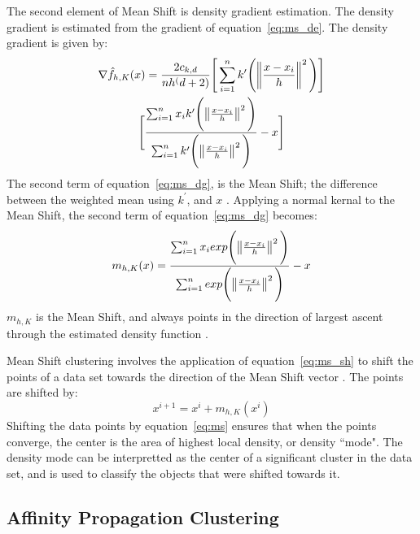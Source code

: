 The second element of Mean Shift is density gradient estimation. 
The density gradient is estimated from the gradient of equation~\ref{eq:ms_de}\citet{vatturi09}.
The density gradient is given by: 
\begin{multline}
\label{eq:ms_dg}
\nabla\hat{f}_{h,K}(x) = \frac{2c_{k,d}}{nh^(d+2)} \Bigg[ \sum_{i=1}^n k^{\prime} \Bigg( \norm{\frac{x-x_{i}}{h}}^2 \Bigg) \Bigg] \\ \Bigg[\frac{\sum_{i=1}^n x_{i}k^{\prime} \Bigg( \norm{\frac{x-x_{i}}{h}}^2 \Bigg)}{\sum_{i=1}^n k^{\prime} \Bigg( \norm{\frac{x-x_{i}}{h}}^2 \Bigg)} - x \Bigg]
\end{multline}
The second term of equation~\ref{eq:ms_dg}, is the Mean Shift; the difference between the weighted mean using $k^{\prime}$, and $x$ \citet{vatturi09}.
Applying a normal kernal to the Mean Shift, the second term of equation~\ref{eq:ms_dg} becomes: 
\begin{equation} 
\label{eq:ms_sh}
m_{h,K}(x) = \frac{\sum_{i=1}^n x_{i} exp \Bigg(\norm{\frac{x-x_{i}}{h}}^2 \Bigg)}{\sum_{i=1}^n exp \Bigg(\norm{\frac{x-x_{i}}{h}}^2 \Bigg)} - x
\end{equation}
$m_{h,K}$ is the Mean Shift, and always points in the direction of largest ascent through the estimated density function \citet{vatturi09}.

Mean Shift clustering involves the application of equation~\ref{eq:ms_sh} to shift the points of a data set towards the direction of the Mean Shift vector \citet{vatturi09}. 
The points are shifted by: 
\begin{equation}
\label{eq:ms}
x^{i+1} = x^i + m_{h,K}(x^i)
\end{equation}
Shifting the data points by equation~\ref{eq:ms} ensures that when the points converge, the center is the area of highest local density, or density ``mode". 
The density mode can be interpretted as the center of a significant cluster in the data set, and is used to classify the objects that were shifted towards it.

\subsection{Affinity Propagation Clustering}

